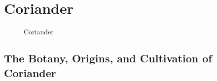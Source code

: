 \section{Coriander}
\label{sec:coriander}



\begin{figure}[!ht]
	\vspace{-4ex}
	\centering
	\hfill
	\caption{Coriander \taxon{}.}
	\label{fig:coriander_imgs}
\end{figure}

\subsection{The Botany, Origins, and Cultivation of Coriander}


